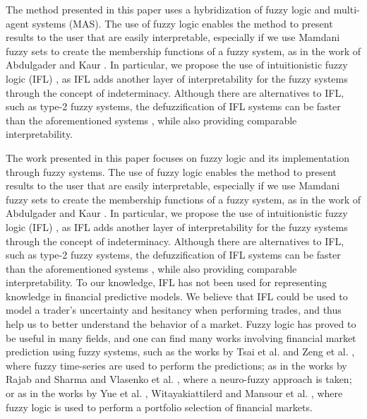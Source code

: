 \documentclass{ieeeaccess}
\begin{document}
The method presented in this paper uses a hybridization of fuzzy logic
and multi-agent systems (MAS). The use of fuzzy logic enables
the method to present results to the user that are easily
interpretable, especially if we use Mamdani fuzzy sets \cite{Mamdani1975} 
to create the membership functions of a fuzzy system, as in the
work of Abdulgader and Kaur \cite{Abdulgader2019}. %
In particular, we
propose the use of intuitionistic fuzzy logic (IFL)
\cite{Atanassov1986} \cite{Atanassov2003}, as IFL adds another layer
of interpretability for the fuzzy systems through the concept of
indeterminacy. Although there are alternatives to IFL, such as type-2
fuzzy systems, the defuzzification of IFL systems can be faster than
the aforementioned systems \cite{Hernandez-Aguila2016}, while also
providing comparable interpretability.

The work presented in this paper focuses on fuzzy logic and its
implementation through fuzzy systems. The use of fuzzy logic enables
the method to present results to the user that are easily
interpretable, especially if we use Mamdani fuzzy sets \cite{Mamdani1975} 
to create the membership functions of a fuzzy system, as in the
work of Abdulgader and Kaur \cite{Abdulgader2019}. In particular, we
propose the use of intuitionistic fuzzy logic (IFL)
\cite{Atanassov1986} \cite{Atanassov2003}, as IFL adds another layer
of interpretability for the fuzzy systems through the concept of
indeterminacy. Although there are alternatives to IFL, such as type-2
fuzzy systems, the defuzzification of IFL systems can be faster than
the aforementioned systems \cite{Hernandez-Aguila2016}, while also
providing comparable interpretability. To our knowledge, IFL has not been
used for representing knowledge in financial predictive models. We
believe that IFL could be used to model a trader's uncertainty and
hesitancy when performing trades, and thus help us to better understand
the behavior of a market.
Fuzzy logic has proved to be useful in many fields, and one can find
many works involving financial market prediction using fuzzy systems,
such as the works by Tsai et al. \cite{Tsai2019} and Zeng et
al. \cite{Zeng2019}, where fuzzy time-series are used to perform the
predictions; as in the works by Rajab and Sharma \cite{Rajab2019} and
Vlasenko et al. \cite{Vlasenko2019}, where a neuro-fuzzy approach is
taken; or as in the works by Yue et al. \cite{Yue2019},
Witayakiattilerd \cite{Witayakiattilerd2019} and Mansour et
al. \cite{Mansour2019}, where fuzzy logic is used to perform a
portfolio selection of financial markets.
\end{document}
